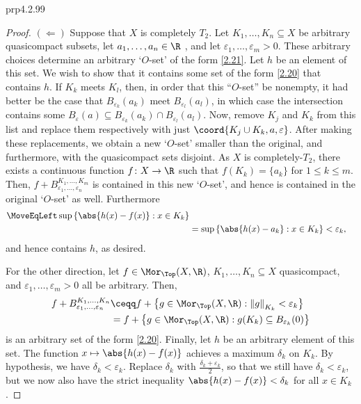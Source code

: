 \begin{prp}{}{prp4.2.99}
\begin{proof}
		\blni
		$(\Leftarrow )$ Suppose that $X$ is completely $T_2$.  Let $K_1,\ldots ,K_n\subseteq X$ be arbitrary quasicompact subsets, let $a_1,\ldots ,a_n\in \R$ , and let $\varepsilon _1,\ldots ,\varepsilon _m>0$.  These arbitrary choices determine an arbitrary `$O$-set' of the form \eqref{2.21}.  Let $h$ be an element of this set.  We wish to show that it contains some set of the form \eqref{2.20} that contains $h$.  If $K_k$ meets $K_l$, then, in order that this ``$O$-set'' be nonempty, it had better be the case that $B_{\varepsilon _k}(a_k)$ meet $B_{\varepsilon _l}(a_l)$, in which case the intersection contains some $B_{\varepsilon}(a)\subseteq B_{\varepsilon _k}(a_k)\cap B_{\varepsilon _l}(a_l)$.  Now, remove $K_j$ and $K_k$ from this list and replace them respectively with just $\coord{K_j\cup K_k,a,\varepsilon}$.   After making these replacements, we obtain a new `$O$-set' smaller than the original, and furthermore, with the quasicompact sets disjoint.  As $X$ is completely-$T_2$, there exists a continuous function $f\colon X\rightarrow \R$ such that $f(K_k)=\{ a_k\}$ for $1\leq k\leq m$.  Then, $f+B_{\varepsilon _1,\ldots ,\varepsilon _n}^{K_1,\ldots ,K_m}$ is contained in this new `$O$-set', and hence is contained in the original `$O$-set' as well.  Furthermore
		\begin{equation}
		\begin{split}
		\MoveEqLeft
		\sup \left\{ \abs{h(x)-f(x)}:x\in K_k\right\} \\
		& =\sup \left\{ \abs{h(x)-a_k}:x\in K_k\right\} <\varepsilon _k,
		\end{split}
		\end{equation}
		and hence contains $h$, as desired. 
		
		For the other direction, let $f\in \Mor _{\Top}(X,\R )$, $K_1,\ldots ,K_n\subseteq X$ quasicompact, and $\varepsilon _1,\ldots ,\varepsilon _m>0$ all be arbitrary.  Then,
		\begin{equation}\label{eqn4.2.105}
			\begin{split}
				f+B_{\varepsilon _1,\ldots ,\varepsilon _n}^{K_1,\ldots ,K_n} & \ceqq f+\left\{ g\in \Mor _{\Top}(X,\R ):\left\| g\right\| _{K_k}<\varepsilon _k\right\} \\
				& =f+\left\{ g\in \Mor _{\Top}(X,\R ):g(K_k)\subseteq B_{\varepsilon _k}(0)\right\} 
			\end{split}
		\end{equation}
		is an arbitrary set of the form \eqref{2.20}.  Finally, let $h$ be an arbitrary element of this set.   The function $x\mapsto \abs{h(x)-f(x)}$ achieves a maximum $\delta _k$ on $K_k$.  By hypothesis, we have $\delta _k<\varepsilon _k$.  Replace $\delta _k$ with $\frac{\delta _k+\varepsilon _k}{2}$, so that we still have $\delta _k<\varepsilon _k$, but we now also have the strict inequality $\abs{h(x)-f(x)}<\delta _k$ for all $x\in K_k$.
		

\end{proof}
\end{prp}
